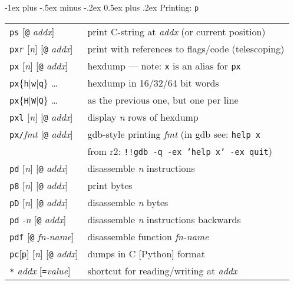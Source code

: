 \documentclass[a4paper,landscape]{article}
\makeatletter
\renewcommand{\section}{\@startsection{section}{1}{0mm}%
                                {-1ex plus -.5ex minus -.2ex}%
                                {0.5ex plus .2ex}%
                                {\normalfont\large\bfseries}}
\makeatother
\begin{document}
\begin{multicols*}{3}
\section{Printing: \texttt{p}}
\begin{tabular}{@{}ll@{}}
\texttt{ps} [\texttt{@} \textit{addx}]& print C-string at \textit{addx} (or current position) \\
\texttt{pxr} [\textit{n}] [\texttt{@} \textit{addx}] & print with references to flags/code (telescoping) \\
\texttt{px} [\textit{n}] [\texttt{@} \textit{addx}] & hexdump --- note: \texttt{x} is an alias for \texttt{px}\\
\texttt{px}$\{$\texttt{h}$|$\texttt{w}$|$\texttt{q}$\}$ \ldots & hexdump in 16/32/64 bit words \\
\texttt{px}$\{$\texttt{H}$|$\texttt{W}$|$\texttt{Q}$\}$ \ldots & as the previous one, but one per line \\
\texttt{pxl} [\textit{n}] [\texttt{@} \textit{addx}] & display \textit{n} rows of hexdump \\
\texttt{px/}\textit{fmt} [\texttt{@} \textit{addx}] & gdb-style printing \textit{fmt} (in gdb see: \texttt{help x} \\ & from r2: \texttt{!!gdb -q -ex 'help x' -ex quit}) \\
\texttt{pd} [\textit{n}] [\texttt{@} \textit{addx}] & disassemble \textit{n} instructions \\
\texttt{p8} [\textit{n}] [\texttt{@} \textit{addx}] & print bytes \\
\texttt{pD} [\textit{n}] [\texttt{@} \textit{addx}] & disassemble \textit{n} bytes \\
\texttt{pd} \textit{-n}  [\texttt{@} \textit{addx}] & disassemble \textit{n} instructions backwards \\
\texttt{pdf} [\texttt{@} \textit{fn-name}] & disassemble function \textit{fn-name} \\
\texttt{pc}[\texttt{p}] [\textit{n}] [\texttt{@} \textit{addx}] & dumps in C [Python] format \\
\texttt{*} \textit{addx} [\texttt{=}\textit{value}] & shortcut for reading/writing at \textit{addx} \\
\end{tabular}


\end{multicols*}
\end{document}
